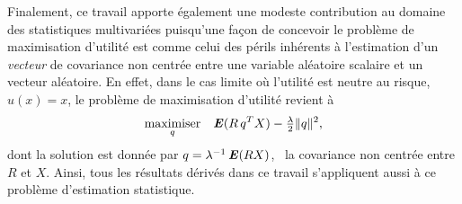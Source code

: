 Finalement, ce travail apporte également une modeste contribution au domaine des
statistiques multivariées puisqu'une façon de concevoir le problème de maximisation
d'utilité est comme celui des périls inhérents à l'estimation d'un \textit{vecteur} de
covariance non centrée entre une variable aléatoire scalaire et un vecteur aléatoire. En
effet, dans le cas limite où l'utilité est neutre au risque, \ie\ $u(x) = x$, le problème
de maximisation d'utilité revient à
\begin{equation}
  \maximizeEquation[q]{\E(R\,q^TX) - \tfrac{\lambda}{2}\|q\|^2,}
\end{equation}
dont la solution est donnée par $q =  \lambda^{-1}\E(RX)$, \ie\ la covariance non centrée
entre $R$ et $X$. Ainsi, tous les résultats dérivés dans ce travail s'appliquent aussi à
ce problème d'estimation statistique.



